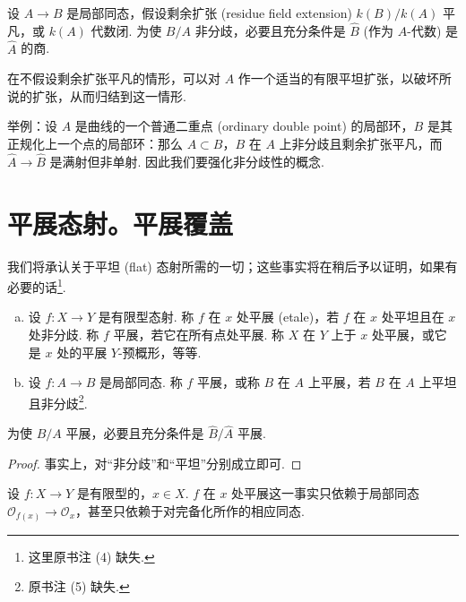 \begin{proposition}\label{prop:I.3.7}
设 $A \to B$ 是局部同态，假设剩余扩张 (residue field extension) $k(B)/k(A)$ 平凡，或 $k(A)$ 代数闭. 为使 $B/A$ 非分歧，必要且充分条件是 $\widehat{B}$ (作为 $A$-代数) 是 $\widehat{A}$ 的商.
\end{proposition}

\begin{remarkstar}
在不假设剩余扩张平凡的情形，可以对 $A$ 作一个适当的有限平坦扩张，以破坏所说的扩张，从而归结到这一情形.

举例：设 $A$ 是曲线的一个普通二重点 (ordinary double point) 的局部环，$B$ 是其正规化上一个点的局部环：那么 $A \subset B$，$B$ 在 $A$ 上非分歧且剩余扩张平凡，而 $\widehat{A} \to \widehat{B}$ 是满射但非单射. 因此我们要强化非分歧性的概念.
\end{remarkstar}

\section{平展态射。平展覆盖}

我们将承认关于平坦 (flat) 态射所需的一切；这些事实将在稍后予以证明，如果有必要的话\footnote{这里原书注 (4) 缺失.}.

\begin{definition}\label{def:I.4.1}
\begin{enumerate}[a)]
\item 设 $f \colon X \to Y$ 是有限型态射. 称 $f$ 在 $x$ 处平展 (etale)，若 $f$ 在 $x$ 处平坦且在 $x$ 处非分歧. 称 $f$ 平展，若它在所有点处平展. 称 $X$ 在 $Y$ 上于 $x$ 处平展，或它是 $x$ 处的平展 $Y$-预概形，等等.
\item 设 $f \colon A \to B$ 是局部同态. 称 $f$ 平展，或称 $B$ 在 $A$ 上平展，若 $B$ 在 $A$ 上平坦且非分歧\footnote{原书注 (5) 缺失.}.
\end{enumerate}
\end{definition}

\begin{proposition}\label{prop:I.4.2}
为使 $B/A$ 平展，必要且充分条件是 $\widehat{B}/\widehat{A}$ 平展.
\end{proposition}

\begin{proof}
事实上，对``非分歧''和``平坦''分别成立即可.
\end{proof}

\begin{corollary}\label{cor:I.4.3}
设 $f \colon X \to Y$ 是有限型的，$x \in X$. $f$ 在 $x$ 处平展这一事实只依赖于局部同态 $\mathcal{O}_{f(x)} \to \mathcal{O}_x$，甚至只依赖于对完备化所作的相应同态.
\end{corollary}

